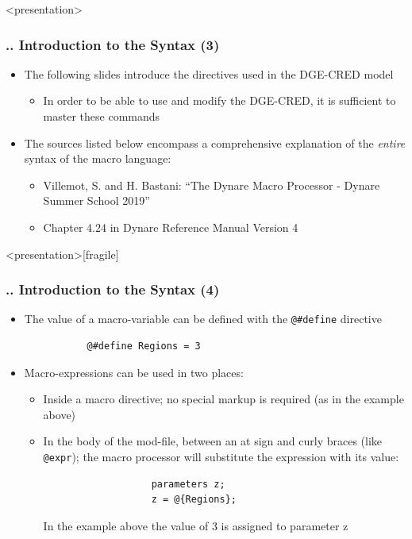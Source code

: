 \documentclass[11pt,aspectratio=169]{beamer}
\begin{document}
\begin{frame}<presentation>
	\frametitle{{\thesection.\thesubsection.\thesubsubsection} Introduction to the Syntax (3)}
	\begin{itemize}
		\item The following slides introduce the directives used in the DGE-CRED model
		\begin{itemize}
			\item In order to be able to use and modify the DGE-CRED, it is sufficient to master these commands
		\end{itemize} 
		\item The sources listed below encompass a comprehensive explanation of the \textit{entire} syntax of the macro language:
		\begin{itemize}
			\item Villemot, S. and H. Bastani: ``The Dynare Macro Processor - Dynare Summer School 2019''
			\item Chapter 4.24 in Dynare Reference Manual Version 4
		\end{itemize}
	\end{itemize}
\end{frame}
\begin{frame}<presentation>[fragile]
	\frametitle{{\thesection.\thesubsection.\thesubsubsection} Introduction to the Syntax (4)}
	\begin{itemize}
		\item The value of a macro-variable can be defined with the \texttt{@\#define} directive
		\begin{verbatim}
		   @#define Regions = 3
		\end{verbatim}
		\item Macro-expressions can be used in two places:
		\begin{itemize}
			\item Inside a macro directive; no special markup is required (as in the example above)
			\item In the body of the mod-file, between an at sign and curly braces (like \texttt{@{expr}}); the macro processor will substitute the expression with its value:
				\begin{verbatim}
				   parameters z;
				   z = @{Regions};
				\end{verbatim}
			In the example above the value of 3 is assigned to parameter z
		\end{itemize}
	\end{itemize}
\end{frame}
\end{document}
